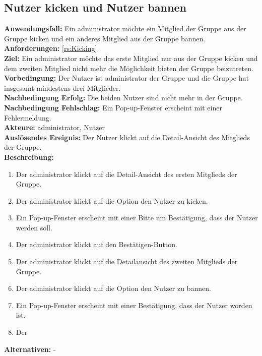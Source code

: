 \documentclass[parskip=full]{scrartcl}
\begin{document}
\subsection{Nutzer kicken und Nutzer bannen}
\textbf{Anwendungsfall:} Ein \Gls{administrator} möchte ein Mitglied der Gruppe aus der Gruppe \gls{kicken} und ein anderes Mitglied aus der Gruppe \gls{bannen}.\\
\textbf{Anforderungen:} \ref{rs:Kicking}\\
\textbf{Ziel:} Ein \Gls{administrator} möchte das erste Mitglied nur aus der Gruppe \gls{kicken} und dem zweiten Mitglied nicht mehr die Möglichkeit bieten der Gruppe beizutreten.\\
\textbf{Vorbedingung:} Der Nutzer ist \Gls{administrator} der Gruppe und die Gruppe hat insgesamt mindestens drei Mitglieder.\\
\textbf{Nachbedingung Erfolg:} Die beiden Nutzer sind nicht mehr in der Gruppe.\\
\textbf{Nachbedingung Fehlschlag:} Ein Pop-up-Fenster erscheint mit einer Fehlermeldung.\\
\textbf{Akteure:} \Gls{administrator}, Nutzer\\
\textbf{Auslösendes Ereignis:} Der Nutzer klickt auf die Detail-Ansicht des Mitglieds der Gruppe.\\
\textbf{Beschreibung:}
\begin{enumerate}
    \item Der \Gls{administrator} klickt auf die Detail-Ansicht des ersten Mitglieds der Gruppe.
    \item Der \Gls{administrator} klickt auf die Option den Nutzer zu \gls{kicken}.
    \item Ein Pop-up-Fenster erscheint mit einer Bitte um Bestätigung, dass der Nutzer  werden soll.
    \item Der \Gls{administrator} klickt auf den Bestätigen-Button.
    \item Der \Gls{administrator} klickt auf die Detailansicht des zweiten Mitglieds der Gruppe.
    \item Der \Gls{administrator} klickt auf die Option den Nutzer zu \gls{bannen}.
    \item Ein Pop-up-Fenster erscheint mit einer Bestätigung, dass der Nutzer  worden ist.
    \item Der 
\end{enumerate}
\textbf{Alternativen:} -
\newpage
\end{document}
